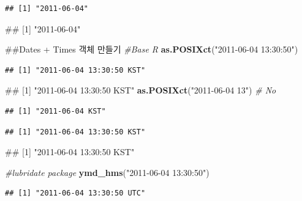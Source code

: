 \documentclass[10pt,]{krantz}
\makeatletter
\newenvironment{Shaded}{\begin{snugshade}}{\end{snugshade}}
\newcommand{\KeywordTok}[1]{\textcolor[rgb]{0.13,0.29,0.53}{\textbf{#1}}}
\newcommand{\StringTok}[1]{\textcolor[rgb]{0.31,0.60,0.02}{#1}}
\newcommand{\CommentTok}[1]{\textcolor[rgb]{0.56,0.35,0.01}{\textit{#1}}}
\newcommand{\NormalTok}[1]{#1}
\newenvironment{kframe}{%
\medskip{}
\setlength{\fboxsep}{.8em}
 \def\at@end@of@kframe{}%
 \ifinner\ifhmode%
  \def\at@end@of@kframe{\end{minipage}}%
  \begin{minipage}{\columnwidth}%
 \fi\fi%
 \def\FrameCommand##1{\hskip\@totalleftmargin \hskip-\fboxsep
 \colorbox{shadecolor}{##1}\hskip-\fboxsep
     \hskip-\linewidth \hskip-\@totalleftmargin \hskip\columnwidth}%
 \MakeFramed {\advance\hsize-\width
   \@totalleftmargin\z@ \linewidth\hsize
   \@setminipage}}%
 {\par\unskip\endMakeFramed%
 \at@end@of@kframe}
\renewenvironment{Shaded}{\begin{kframe}}{\end{kframe}}
\makeatother
\begin{document}
\begin{verbatim}
## [1] "2011-06-04"
\end{verbatim}

\begin{Shaded}
\begin{Highlighting}[]
\NormalTok{## [1] "2011-06-04"}

\NormalTok{##Dates + Times 객체 만들기}
\CommentTok{#Base R}
\KeywordTok{as.POSIXct}\NormalTok{(}\StringTok{"2011-06-04 13:30:50"}\NormalTok{)}
\end{Highlighting}
\end{Shaded}

\begin{verbatim}
## [1] "2011-06-04 13:30:50 KST"
\end{verbatim}

\begin{Shaded}
\begin{Highlighting}[]
\NormalTok{## [1] "2011-06-04 13:30:50 KST"}
\KeywordTok{as.POSIXct}\NormalTok{(}\StringTok{"2011-06-04 13"}\NormalTok{) }\CommentTok{# No}
\end{Highlighting}
\end{Shaded}

\begin{verbatim}
## [1] "2011-06-04 KST"
\end{verbatim}

\begin{Shaded}
\end{Shaded}

\begin{verbatim}
## [1] "2011-06-04 13:30:50 KST"
\end{verbatim}

\begin{Shaded}
\begin{Highlighting}[]
\NormalTok{## [1] "2011-06-04 13:30:50 KST"}

\CommentTok{#lubridate package}
\KeywordTok{ymd_hms}\NormalTok{(}\StringTok{"2011-06-04 13:30:50"}\NormalTok{)}
\end{Highlighting}
\end{Shaded}

\begin{verbatim}
## [1] "2011-06-04 13:30:50 UTC"
\end{verbatim}
\end{document}
